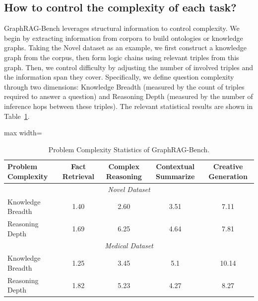 \documentclass{article} %
\begin{document}
\subsection{How to control the complexity of each task?}
GraphRAG-Bench leverages structural information to control complexity. We begin by extracting information from corpora to build ontologies or knowledge graphs. Taking the Novel dataset as an example, we first construct a knowledge graph from the corpus, then form logic chains using relevant triples from this graph. Then, we control difficulty by adjusting the number of involved triples and the information span they cover. Specifically, we define question complexity through two dimensions: Knowledge Breadth (measured by the count of triples required to answer a question) and Reasoning Depth (measured by the number of inference hops between these triples). The relevant statistical results are shown in Table~\ref{tab:appendix-problem_complexity}.

\begin{table}[ht]
\centering
\small
{\renewcommand{\arraystretch}{1.4}
\caption{Problem Complexity Statistics of GraphRAG-Bench.}
\label{tab:appendix-problem_complexity}
\begin{adjustbox}{max width=\linewidth}
\begin{tabular}{lcccc}
\hline
\textbf{Problem Complexity} & \textbf{Fact Retrieval} & \textbf{Complex Reasoning} & \textbf{Contextual Summarize} & \textbf{Creative Generation} \\
\hline
\multicolumn{5}{c}{\cellcolor[HTML]{EFEFEF}\textit{Novel Dataset}} \\
\quad Knowledge Breadth & 1.40 & 2.60 & 3.51 & 7.11 \\
\quad Reasoning Depth   & 1.69 & 6.25 & 4.64 & 7.81 \\
\hline
\multicolumn{5}{c}{\cellcolor[HTML]{EFEFEF}\textit{Medical Dataset}} \\
\quad Knowledge Breadth & 1.25 & 3.45 & 5.1 & 10.14 \\ 
\quad Reasoning Depth   & 1.82 & 5.23 & 4.27 & 8.27 \\ 
\hline
\end{tabular}
\end{adjustbox}}
\end{table}
\end{document}
